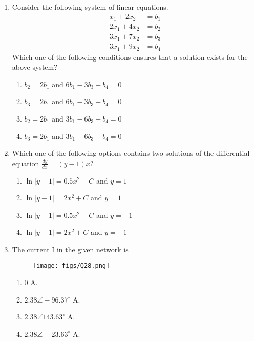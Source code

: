 \documentclass[a4paper, 11pt]{article}
\begin{document}
\begin{enumerate}
    \hfill{}

    \item Consider the following system of linear equations.
    \begin{align*}
        x_1 + 2x_2 &= b_1 \\
        2x_1 + 4x_2 &= b_2 \\
        3x_1 + 7x_2 &= b_3 \\
        3x_1 + 9x_2 &= b_4
    \end{align*}
    Which one of the following conditions ensures that a solution exists for the above system?
    \begin{enumerate}
        \item $b_2=2b_1$ and $6b_1 - 3b_3 + b_4 = 0$
        \item $b_3=2b_1$ and $6b_1 - 3b_3 + b_4 = 0$
        \item $b_2=2b_1$ and $3b_1 - 6b_3 + b_4 = 0$
        \item $b_3=2b_1$ and $3b_1 - 6b_3 + b_4 = 0$
    \end{enumerate}

    \hfill{}

    \item Which one of the following options contains two solutions of the differential equation $\frac{dy}{dx} = (y-1)x$?
    \begin{enumerate}
        \item $\ln|y-1| = 0.5x^2+C$ and $y=1$
        \item $\ln|y-1| = 2x^2+C$ and $y=1$
        \item $\ln|y-1| = 0.5x^2+C$ and $y=-1$
        \item $\ln|y-1| = 2x^2+C$ and $y=-1$
    \end{enumerate}

    \hfill{}
    
    \item The current I in the given network is
    \begin{figure}[H]
        \centering
        \texttt{[image: figs/Q28.png]}
        \caption*{}
        \label{fig:q38}
    \end{figure}
    \begin{enumerate}
        \item 0 A.
        \item $2.38\angle-96.37^{\circ}$ A.
        \item $2.38\angle143.63^{\circ}$ A.
        \item $2.38\angle-23.63^{\circ}$ A.
    \end{enumerate}


\end{enumerate}
\end{document}

